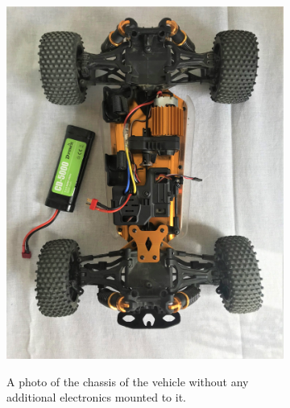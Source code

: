 \begin{figure}[!tbp]%
	\centering
	\begin{subfigure}[t]{0.45\textwidth}
		\includegraphics[width=\textwidth]{../img/car_top_no_electronics}
		\label{fig:chassis_no_electronics}
		\caption{A photo of the chassis of the vehicle without any additional electronics mounted to it.}
	\end{subfigure}
	\hfill
	\begin{subfigure}[t]{0.45\textwidth}

\end{subfigure}
\end{figure}
